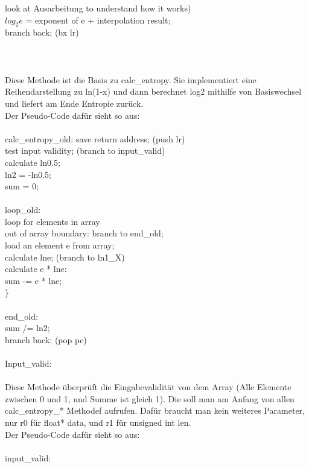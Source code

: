 \documentclass[11pt]{article}
\begin{document}
{{              look at Ausarbeitung to understand how it works)\\
	$log_2{e}$ = exponent of e + interpolation result;\\
	branch back; (bx lr)\\\\
{\color{red}{\Large calc\_entropy\_old(float* data, unsigned int len):}}\\\\
Diese Methode ist die Basis zu calc\_entropy. Sie implementiert eine Reihendarstellung zu ln(1-x) und dann berechnet log2 mithilfe von Basiswechsel und liefert am Ende Entropie zur\"uck.\\
Der Pseudo-Code daf\"ur sieht so aus:\\\\
calc\_entropy\_old:
	save return address; (push {lr})\\
	test input validity; (branch to input\_valid)\\
	calculate ln0.5;\\
	ln2 = -ln0.5;\\
	sum = 0;\\\\
loop\_old:\\
	loop for elements in array{\\
		out of array boundary: branch to end\_old;\\
		load an element e from array;\\
		calculate lne; (branch to ln1\_X)\\
		calculate e * lne:\\
		sum -= e * lne;\\
\}\\\\
end\_old:\\
	sum /= ln2;\\
	branch back; (pop {pc})\\\\
\color{red} {\Large Input\_valid:}}\\\\
Diese Methode \"uberpr\"uft die Eingabevalidit\"at von dem Array (Alle Elemente zwischen 0 und 1, und Summe ist gleich 1). Die soll man am Anfang von allen calc\_entropy\_* Methodef aufrufen. Daf\"ur braucht man kein weiteres Parameter, nur r0 f\"ur float* data, und r1 f\"ur unsigned int len.\\
Der Pseudo-Code daf\"ur sieht so aus:\\\\
input\_valid:\\
}}
\end{document}
